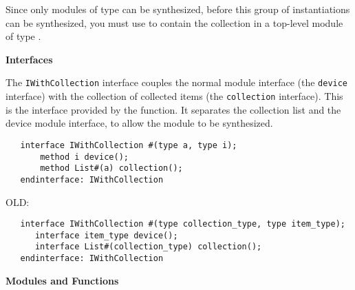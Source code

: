 Since only modules of type  can be synthesized, before this
group of  instantiations can be 
synthesized, you must use   to  contain
the collection in a top-level module of type . 







{\bf Interfaces}

The \texttt{IWithCollection} interface couples the normal module
interface (the \texttt{device} interface) with the collection of
collected items (the \texttt{collection} interface).  This is the
interface provided by the  function.  It separates
the collection list and the device  module interface, to allow the module to be synthesized.

\begin{verbatim}
   interface IWithCollection #(type a, type i);
       method i device();
       method List#(a) collection();
   endinterface: IWithCollection
\end{verbatim}

OLD:
\begin{verbatim}
   interface IWithCollection #(type collection_type, type item_type);
      interface item_type device();
      interface List#(collection_type) collection();
   endinterface: IWithCollection
\end{verbatim}


{\bf Modules and Functions}

